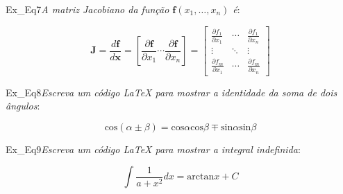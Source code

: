 \begin{texercise}{Ex_Eq7}\textit{A matriz Jacobiano da função \(\mathbf{f}(x_1, \dots, x_n)\) é}:\par\smallskip%
\begin{tcboutputlisting}
    \begin{center}
        \begin{equation*}
            \mathbf{J}
            =
            \frac{d \mathbf{f}}{d \mathbf{x}}
            =
            \left[ \frac{\partial \mathbf{f}}{\partial x_1}
            \cdots \frac{\partial \mathbf{f}}{\partial x_n} \right]
            =
            \begin{bmatrix}
            \frac{\partial f_1}{\partial x_1} & \cdots &
            \frac{\partial f_1}{\partial x_n} \\
            \vdots & \ddots & \vdots \\
            \frac{\partial f_m}{\partial x_1} & \cdots &
            \frac{\partial f_m}{\partial x_n}
            \end{bmatrix}
        \end{equation*}
    \end{center}
\end{tcboutputlisting}
\tcbuselistingtext%
\end{texercise}

\begin{texercise}{Ex_Eq8}\textit{Escreva um código LaTeX para mostrar a identidade da soma de dois ângulos}:\par\smallskip%
\begin{tcboutputlisting}
    \begin{center}
        \begin{equation*}
            \text{cos}(\alpha \pm \beta) = \text{cos}\alpha \text{cos}\beta \mp \text{sin}\alpha \text{sin}\beta
        \end{equation*}
    \end{center}
\end{tcboutputlisting}
\tcbuselistingtext%
\end{texercise}

\begin{texercise}{Ex_Eq9}\textit{Escreva um código LaTeX para mostrar a integral indefinida}:\par\smallskip%
\begin{tcboutputlisting}
    \begin{center}
        \begin{equation*}
            \int \frac{1}{a+x^2}dx = \text{arctan} x + C
        \end{equation*}
    \end{center}
\end{tcboutputlisting}
\tcbuselistingtext%
\end{texercise}


